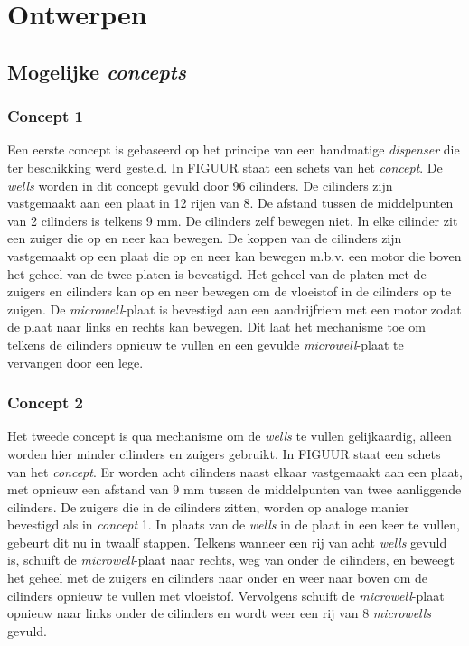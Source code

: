 \documentclass[a4paper,twoside,kulak]{kulakreport} %
\begin{document}
\chapter{Ontwerpen} 
\section{Mogelijke \textit{concepts}}
\subsection{Concept 1}
Een eerste concept is gebaseerd op het principe van een handmatige \textit{dispenser} die ter beschikking werd gesteld. In FIGUUR staat een schets van het \textit{concept}. De \textit{wells} worden in dit concept gevuld door 96 cilinders. De cilinders zijn vastgemaakt aan een plaat in 12 rijen van 8. De afstand tussen de middelpunten van 2 cilinders is telkens 9 mm. De cilinders zelf bewegen niet. In elke cilinder zit een zuiger die op en neer kan bewegen. De koppen van de cilinders zijn vastgemaakt op een plaat die op en neer kan bewegen m.b.v. een motor die boven het geheel van de twee platen is bevestigd. Het geheel van de platen met de zuigers en cilinders kan op en neer bewegen om de vloeistof in de cilinders op te zuigen. De \textit{microwell}-plaat is bevestigd aan een aandrijfriem met een motor zodat de plaat naar links en rechts kan bewegen. Dit laat het mechanisme toe om telkens de cilinders opnieuw te vullen en een gevulde \textit{microwell}-plaat te vervangen door een lege.  

\subsection{Concept 2}
Het tweede concept is qua mechanisme om de \textit{wells} te vullen gelijkaardig, alleen worden hier minder cilinders en zuigers gebruikt. In FIGUUR staat een schets van het \textit{concept}. Er worden acht cilinders naast elkaar vastgemaakt aan een plaat, met opnieuw een afstand van 9 mm tussen de middelpunten van twee aanliggende cilinders. De zuigers die in de cilinders zitten, worden op analoge manier bevestigd als in \textit{concept} 1. In plaats van de \textit{wells} in de plaat in een keer te vullen, gebeurt dit nu in twaalf stappen. Telkens wanneer een rij van acht \textit{wells} gevuld is, schuift de \textit{microwell}-plaat naar rechts, weg van onder de cilinders, en beweegt het geheel met de zuigers en cilinders naar onder en weer naar boven om de cilinders opnieuw te vullen met vloeistof. Vervolgens schuift de \textit{microwell}-plaat opnieuw naar links onder de cilinders en wordt weer een rij van 8 \textit{microwells} gevuld.
\end{document}

